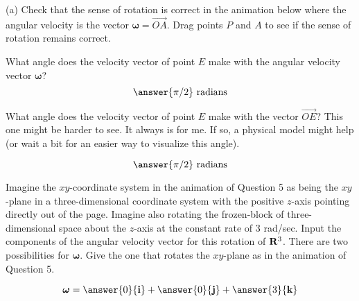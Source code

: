 \documentclass{ximera}
\begin{document}
\begin{exploration}  \label{Ex4gb3e3:Cross}

(a) Check that the sense of rotation is correct in the animation below where the angular velocity is the vector $\boldsymbol{\omega} = \overrightarrow{OA}$. Drag points $P$ and $A$ to see if the sense of rotation remains correct.


 
\begin{onlineOnly}
    \begin{center}
\end{center}
\end{onlineOnly}

\begin{question} \label{Qdsbhjj}
What angle does the velocity vector of point $E$ make with the angular velocity vector $\boldsymbol{\omega}$? 
\[
   \answer{\pi/2} \text{ radians}
\]
\end{question}


\begin{question} \label{Qddsghhhjj}
What angle does the velocity vector of point $E$ make with the vector ${\overrightarrow{OE}}$? This one might be harder to see. It always is for me. If so, a physical model might help (or wait a bit for an easier way to visualize this angle).

\[
   \answer{\pi/2} \text{ radians}
\]
\end{question}




\end{exploration}



Imagine the $xy$-coordinate system in the animation of Question 5  as being the $xy$-plane in a three-dimensional coordinate system with the positive $z$-axis pointing directly out of the page. Imagine also rotating the frozen-block of three-dimensional space about the $z$-axis at the constant rate of $3$ rad/sec. Input the components of the angular velocity vector for this rotation of ${\bf R}^3$. There are two possibilities for $\boldsymbol{\omega}$. Give the one that rotates the $xy$-plane as in the animation of Question 5. 

\begin{question}  \label{Qhfnbyt:Cross}
\[
\boldsymbol{\omega} = \answer{0}{\bf i} + \answer{0}{\bf j} + \answer{3}{\bf k}
\]
\end{question}
\end{document}
